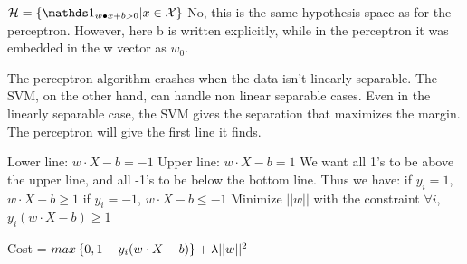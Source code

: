 \documentclass[12pt]{article}
\begin{document}

\begin{enumerate}


$\mathcal{H} = \braces{\indic{w \bullet x +b >0 }| x \in \mathcal{X}}$ No, this is the same hypothesis space as for the perceptron. However, here b is written explicitly, while in the perceptron it was embedded in the w vector as $w_0$. 


The perceptron algorithm crashes when the data isn't linearly separable. The SVM, on the other hand, can handle non linear separable cases. Even in the linearly separable case, the SVM gives the separation that maximizes the margin. The perceptron will give the first line it finds. 


Lower line: $ w \cdot X -b = -1$ \newline 
Upper line: $ w \cdot X -b = 1$ \newline 
We want all 1's to be above the upper line, and all -1's to be below the bottom line. Thus we have: \newline 
if $y_i = 1$, $w \cdot X -b \geq 1$ \newline
if $y_i = -1$, $w \cdot X -b \leq -1$ \newline 
Minimize $\vert \vert w \vert \vert$ with the constraint $\forall i$,   $y_i (w \cdot X -b)\geq 1$ 



Cost = $max\left\{0, 1 -y_i(w \cdot X -b)\right\} +\lambda  \vert \vert w\vert \vert ^2 $

\end{enumerate}
\end{document}
